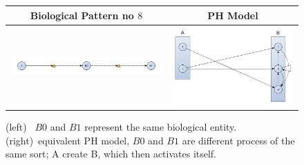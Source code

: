 \documentclass[11pt,a4paper,twoside]{epig}
\begin{document}
\begin{figure}[ht]
\begin{tabular}{|c|c|}
\hline
Biological Pattern no $8$ & PH Model \\
\hline
 \includegraphics[scale=0.3]{./imagesannexe/phdrawings/8cyt.jpg} & \includegraphics[scale=0.12]{./imagesannexe/phdrawings/8ph.jpg} \\
 \hline
\end{tabular}
\caption{\label{fig:pattern:8}
(left)~ $B0$ and $B1$ represent the same biological entity.
(right)~equivalent PH model, $B0$ and $B1$ are different process of the same sort; A create B, which then activates itself.
}
\end{figure}
\end{document}
